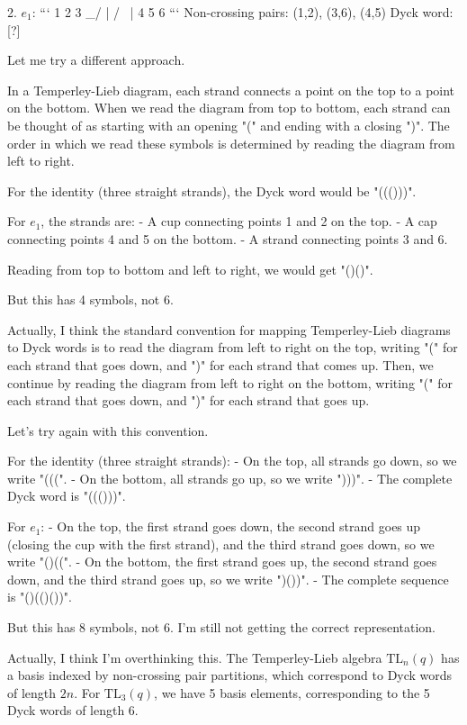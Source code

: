 \documentclass[12p]{article}
\newcounter{reasoningcounter}
\newenvironment{reasoning}[1][]
{\refstepcounter{reasoningcounter}%
\begin{tcolorbox}[
    title=Reasoning \thereasoningcounter: #1,
    colback=white, %
    colframe=gray,
    coltext=black, %
    fonttitle=\bfseries\normalsize,
    top=2mm,
    bottom=2mm,
    enlarge top initially by=5mm
]
\small
}
{\end{tcolorbox}}
\begin{document}
\begin{reasoning}
2. $e_1$:
```
1 2 3
 \_/ |
 / \ |
4 5 6
```
Non-crossing pairs: (1,2), (3,6), (4,5)
Dyck word: [?]

Let me try a different approach.

In a Temperley-Lieb diagram, each strand connects a point on the top to a point on the bottom. When we read the diagram from top to bottom, each strand can be thought of as starting with an opening "(" and ending with a closing ")". The order in which we read these symbols is determined by reading the diagram from left to right.

For the identity (three straight strands), the Dyck word would be "((()))".

For $e_1$, the strands are:
- A cup connecting points 1 and 2 on the top.
- A cap connecting points 4 and 5 on the bottom.
- A strand connecting points 3 and 6.

Reading from top to bottom and left to right, we would get "()()".

But this has 4 symbols, not 6.

Actually, I think the standard convention for mapping Temperley-Lieb diagrams to Dyck words is to read the diagram from left to right on the top, writing "(" for each strand that goes down, and ")" for each strand that comes up. Then, we continue by reading the diagram from left to right on the bottom, writing "(" for each strand that goes down, and ")" for each strand that goes up.

Let's try again with this convention.

For the identity (three straight strands):
- On the top, all strands go down, so we write "(((".
- On the bottom, all strands go up, so we write ")))".
- The complete Dyck word is "((()))".

For $e_1$:
- On the top, the first strand goes down, the second strand goes up (closing the cup with the first strand), and the third strand goes down, so we write "()((".
- On the bottom, the first strand goes up, the second strand goes down, and the third strand goes up, so we write ")())".
- The complete sequence is "()(()())".

But this has 8 symbols, not 6. I'm still not getting the correct representation.

Actually, I think I'm overthinking this. The Temperley-Lieb algebra $\text{TL}_n(q)$ has a basis indexed by non-crossing pair partitions, which correspond to Dyck words of length $2n$. For $\text{TL}_3(q)$, we have 5 basis elements, corresponding to the 5 Dyck words of length 6. 


\end{reasoning}
\end{document}
